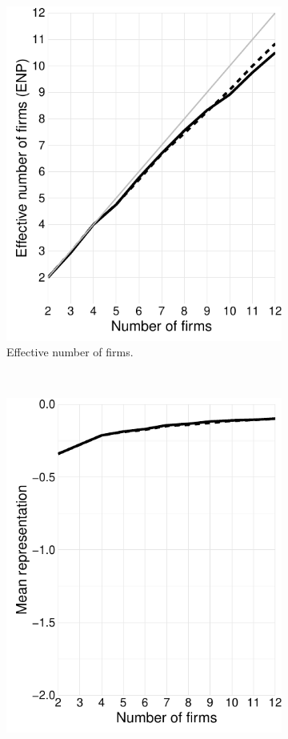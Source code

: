 \documentclass[preprint, 12pt]{elsarticle}
\begin{document}
\begin{figure}[h!]
\begin{subfigure}[t]{0.315\textwidth}
		\includegraphics[width=\textwidth, trim={4mm 0 0 0}]{Graphics/figA12.pdf}
		\caption{Effective number of firms.}
		\label{fig:enp_maxcovrnd}
	\end{subfigure}
	~
	\begin{subfigure}[t]{0.315\textwidth}
		\centering
		\includegraphics[width=\textwidth, trim={4mm 0 0 0}]{Graphics/figA13.pdf}

\end{subfigure}
\end{figure}
\end{document}
